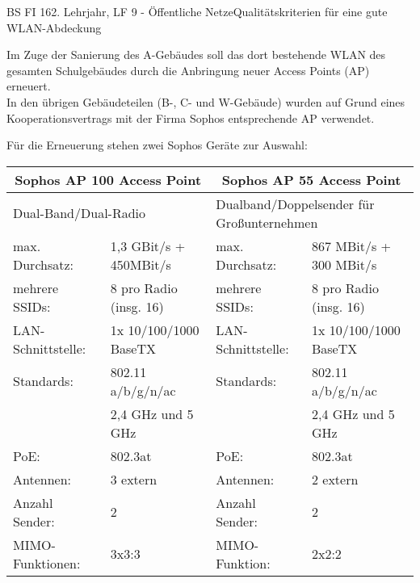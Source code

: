 \documentclass[11pt,oneside,openany,headings=optiontotoc,11pt,numbers=noenddot]{article}
\begin{document}
	\begin{worksheet}{BS FI 16}{2. Lehrjahr, LF 9 - Öffentliche Netze}{Qualitätskriterien für eine gute WLAN-Abdeckung}
		\begin{framed}
			\noindent
			Im Zuge der Sanierung des A-Gebäudes soll das dort bestehende WLAN des gesamten Schulgebäudes durch die Anbringung neuer Access Points (AP) erneuert.\\
			In den übrigen Gebäudeteilen (B-, C- und W-Gebäude) wurden auf Grund eines Kooperationsvertrags mit der Firma Sophos entsprechende AP verwendet.
			\par\noindent
			Für die Erneuerung stehen zwei Sophos Geräte zur Auswahl:\\
			\par\noindent
			\begin{tabularx}{\textwidth}{lX|lX}
				\hline
				\hline
				\multicolumn{2}{c|}{\textbf{Sophos AP 100 Access Point}} & \multicolumn{2}{c}{\textbf{Sophos AP 55 Access Point}}\\
				\hline
				\multicolumn{2}{l|}{Dual-Band/Dual-Radio} &\multicolumn{2}{l}{Dualband/Doppelsender für Großunternehmen}\\
				\hline
				max. Durchsatz: & 1,3 GBit/s + 450MBit/s & max. Durchsatz: & 867 MBit/s + 300 MBit/s\\
				\hline
				mehrere SSIDs: & 8 pro Radio (insg. 16) & mehrere SSIDs: & 8 pro Radio (insg. 16)\\
				\hline
				LAN-Schnittstelle: & 1x 10/100/1000 BaseTX & LAN-Schnittstelle: & 1x 10/100/1000 BaseTX\\
				\hline
				Standards: & 802.11 a/b/g/n/ac & Standards: & 802.11 a/b/g/n/ac\\
				& 2,4 GHz und 5 GHz & & 2,4 GHz und 5 GHz\\
				\hline
				PoE: & 802.3at & PoE: & 802.3at\\
				\hline
				Antennen: & 3 extern & Antennen: & 2 extern\\
				\hline
				Anzahl Sender: & 2 & Anzahl Sender: & 2\\
				\hline
				MIMO-Funktionen: & 3x3:3 & MIMO-Funktion: & 2x2:2\\
				\hline
				\hline
			\end{tabularx}\\
			\par\noindent

\end{framed}
\end{worksheet}
\end{document}
